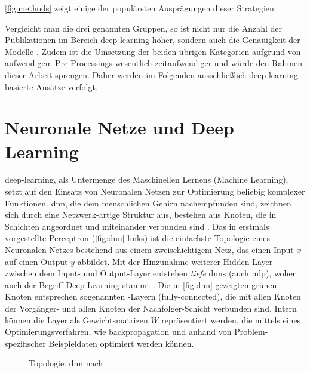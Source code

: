 \autoref{fig:methods} zeigt einige der populärsten Ausprägungen dieser Strategien:

Vergleicht man die drei genannten Gruppen, so ist nicht nur die Anzahl der Publikationen im Bereich \gls{deep-learning} höher, sondern auch die Genauigkeit der Modelle \cite{Rahmad18}.
Zudem ist die Umsetzung der beiden übrigen Kategorien aufgrund von aufwendigem Pre-Processings wesentlich zeitaufwendiger und würde den Rahmen dieser Arbeit sprengen.
Daher werden im Folgenden ausschließlich \gls{deep-learning}-basierte Ansätze verfolgt.


\section{Neuronale Netze und Deep Learning}
\label{sec:deep-learning}

\gls{deep-learning}, als Untermenge des Maschinellen Lernens (Machine Learning), setzt auf den Einsatz von Neuronalen Netzen zur Optimierung beliebig komplexer Funktionen.
\gls{dnn}, die dem menschlichen Gehirn nachempfunden sind, zeichnen sich durch eine Netzwerk-artige Struktur aus, bestehen aus Knoten, die in Schichten angeordnet und miteinander verbunden sind \cite{Burkov19}.
Das in \cite{rosenblatt58} erstmals vorgestellte Perceptron (\autoref{fig:dnn} links) ist die einfachste Topologie eines Neuronalen Netzes bestehend aus einem zweischichtigem Netz, das einen Input $x$ auf einen Output $y$ abbildet.
Mit der Hinzunahme weiterer \sog Hidden-Layer zwischen dem Input- und Output-Layer entstehen \emph{tiefe} \glspl{dnn} (auch \gls{mlp}), woher auch der Begriff Deep-Learning stammt \cite{Burkov19}.
Die in \autoref{fig:dnn} gezeigten grünen Knoten entsprechen sogenannten \fc-Layern (fully-connected), die mit allen Knoten der Vorgänger- und allen Knoten der Nachfolger-Schicht verbunden sind.
Intern können die Layer als Gewichtsmatrizen $W$ repräsentiert werden, die mittels eines Optimierungsverfahren, wie \gls{backpropagation} \cite{rumelhart86} und anhand von Problem-spezifischer Beispieldaten optimiert werden können.

\begin{figure}
    \centering
    \caption{Topologie: \gls{dnn} nach \cite{Veen17}}
    \label{fig:dnn}
\end{figure}




